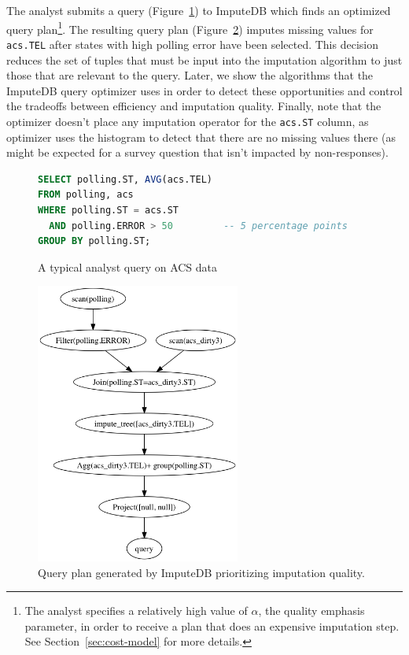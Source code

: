 The analyst submits a query (Figure~\ref{fig:example-query}) to ImputeDB which finds an optimized query
plan\footnote{The analyst specifies a relatively high value of $\alpha$, the quality
emphasis parameter, in order to receive a plan that does an expensive imputation step. See
Section~\ref{sec:cost-model} for more details.}. The resulting query plan
(Figure~\ref{fig:query-plan})
imputes missing values for \verb!acs.TEL! after states with high polling error have been
selected. This decision reduces the set of tuples that must be input into the imputation
algorithm to just those that are relevant to the query. Later, we show the algorithms that
the ImputeDB query optimizer uses in order to detect these opportunities and control the
tradeoffs between efficiency and imputation quality. Finally, note that the optimizer doesn't
place any imputation operator for the \verb|acs.ST| column, as optimizer uses the histogram to
detect that there are no missing values there (as might be expected for a survey question that isn't
impacted by non-responses).

\begin{figure}
\begin{lstlisting}[language=SQL]
SELECT polling.ST, AVG(acs.TEL)
FROM polling, acs
WHERE polling.ST = acs.ST
  AND polling.ERROR > 50         -- 5 percentage points
GROUP BY polling.ST;
\end{lstlisting}
\caption{A typical analyst query on ACS data}
\label{fig:example-query}
\end{figure}

\begin{figure}[!ht]
    \centering
    \includegraphics[width=0.6\textwidth]{figures/example.png}
    \caption{Query plan generated by ImputeDB prioritizing imputation quality.}
    \label{fig:query-plan}
\end{figure}
        
